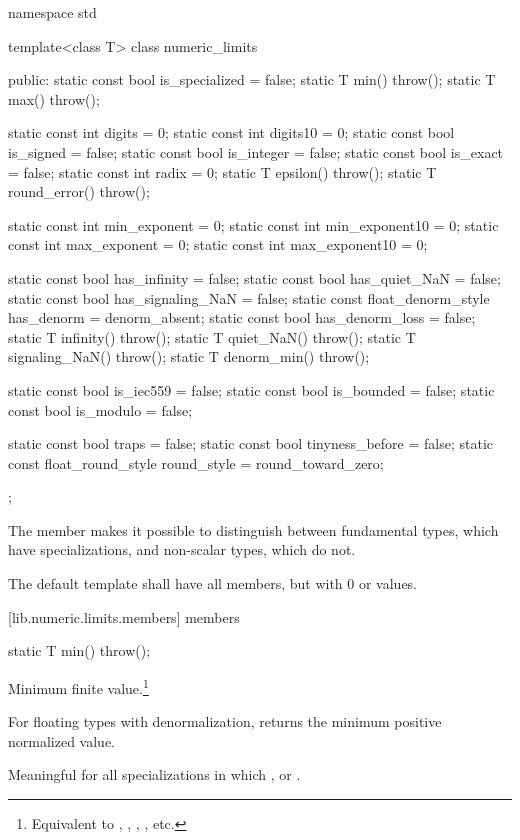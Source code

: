 %
\begin{codeblock}
namespace std {
  template<class T> class numeric_limits {
  public:
    static const bool is_specialized = false;
    static T min() throw();
    static T max() throw();

    static const int  digits = 0;
    static const int  digits10 = 0;
    static const bool is_signed = false;
    static const bool is_integer = false;
    static const bool is_exact = false;
    static const int  radix = 0;
    static T epsilon() throw();
    static T round_error() throw();

    static const int  min_exponent = 0;
    static const int  min_exponent10 = 0;
    static const int  max_exponent = 0;
    static const int  max_exponent10 = 0;

    static const bool has_infinity = false;
    static const bool has_quiet_NaN = false;
    static const bool has_signaling_NaN = false;
    static const float_denorm_style has_denorm = denorm_absent;
    static const bool has_denorm_loss = false;
    static T infinity() throw();
    static T quiet_NaN() throw();
    static T signaling_NaN() throw();
    static T denorm_min() throw();

    static const bool is_iec559 = false;
    static const bool is_bounded = false;
    static const bool is_modulo = false;

    static const bool traps = false;
    static const bool tinyness_before = false;
    static const float_round_style round_style = round_toward_zero;
  };
}
\end{codeblock}

\pnum
The member  makes it possible to distinguish
between fundamental types, which have specializations, and non-scalar
types, which do not.

\pnum
The default
template shall have all members, but with 0 or
values.

[lib.numeric.limits.members]{ members}

\begin{itemdecl}
static T min() throw();
\end{itemdecl}

\begin{itemdescr}
\pnum
Minimum finite value.\footnote{Equivalent to , ,
, , etc.}

\pnum
For floating types with denormalization, returns the minimum positive
normalized value.

\pnum
Meaningful for all specializations in which
,
or
.
\end{itemdescr}

